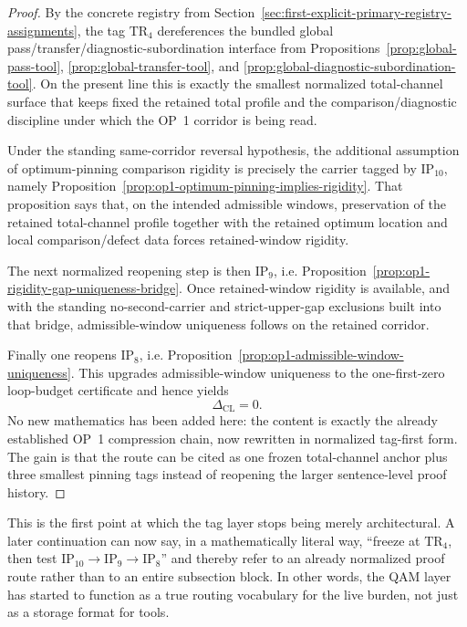 \begin{proof}
By the concrete registry from Section~\ref{sec:first-explicit-primary-registry-assignments}, the tag \(\mathrm{TR}_4\) dereferences the bundled global pass/transfer/diagnostic-subordination interface from Propositions~\ref{prop:global-pass-tool}, \ref{prop:global-transfer-tool}, and \ref{prop:global-diagnostic-subordination-tool}. On the present line this is exactly the smallest normalized total-channel surface that keeps fixed the retained total profile and the comparison/diagnostic discipline under which the OP~1 corridor is being read.

Under the standing same-corridor reversal hypothesis, the additional assumption of optimum-pinning comparison rigidity is precisely the carrier tagged by \(\mathrm{IP}_{10}\), namely Proposition~\ref{prop:op1-optimum-pinning-implies-rigidity}. That proposition says that, on the intended admissible windows, preservation of the retained total-channel profile together with the retained optimum location and local comparison/defect data forces retained-window rigidity.

The next normalized reopening step is then \(\mathrm{IP}_9\), i.e. Proposition~\ref{prop:op1-rigidity-gap-uniqueness-bridge}. Once retained-window rigidity is available, and with the standing no-second-carrier and strict-upper-gap exclusions built into that bridge, admissible-window uniqueness follows on the retained corridor.

Finally one reopens \(\mathrm{IP}_8\), i.e. Proposition~\ref{prop:op1-admissible-window-uniqueness}. This upgrades admissible-window uniqueness to the one-first-zero loop-budget certificate and hence yields
\[
  \Delta_{\mathrm{CL}} = 0.
\]
No new mathematics has been added here: the content is exactly the already established OP~1 compression chain, now rewritten in normalized tag-first form. The gain is that the route can be cited as one frozen total-channel anchor plus three smallest pinning tags instead of reopening the larger sentence-level proof history.
\end{proof}

\begin{remark}
\label{rem:what-the-first-practical-tag-rewrite-buys}
This is the first point at which the tag layer stops being merely architectural. A later continuation can now say, in a mathematically literal way, ``freeze at \(\mathrm{TR}_4\), then test \(\mathrm{IP}_{10}\to\mathrm{IP}_9\to\mathrm{IP}_8\)'' and thereby refer to an already normalized proof route rather than to an entire subsection block. In other words, the QAM layer has started to function as a true routing vocabulary for the live burden, not just as a storage format for tools.
\end{remark}


